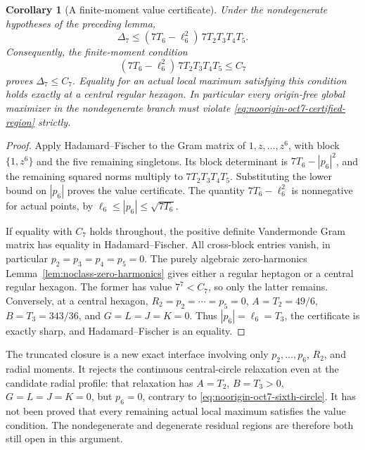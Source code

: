\documentclass[11pt]{article}
\newtheorem{corollary}[theorem]{Corollary}
\theoremstyle{remark}
\numberwithin{equation}{section}
\begin{document}
\begin{corollary}[A finite-moment value certificate]
\label{cor:noorigin-oct7-value-certificate}
Under the nondegenerate hypotheses of the preceding lemma,
\begin{equation}\label{eq:noorigin-oct7-Fischer-sixth}
 \Delta_7\le
             (7T_6-\ell_6^2)\,7T_2T_3T_4T_5.
\end{equation}
Consequently, the finite-moment condition
\begin{equation}\label{eq:noorigin-oct7-certified-region}
     (7T_6-\ell_6^2)\,7T_2T_3T_4T_5\le C_7
\end{equation}
proves $\Delta_7\le C_7$. Equality for an actual local maximum
satisfying this condition holds exactly at a central regular hexagon.
In particular every origin-free global maximizer in the
nondegenerate branch must violate
\eqref{eq:noorigin-oct7-certified-region} strictly.
\end{corollary}
\begin{proof}
Apply Hadamard--Fischer to the Gram matrix of
$1,z,\ldots,z^6$, with block $\{1,z^6\}$ and the five remaining
singletons. Its block determinant is $7T_6-|p_6|^2$, and the
remaining squared norms multiply to $7T_2T_3T_4T_5$. Substituting
the lower bound on $|p_6|$ proves the value certificate.
The quantity $7T_6-\ell_6^2$ is nonnegative for actual points,
by $\ell_6\le|p_6|\le\sqrt{7T_6}$.

If equality with $C_7$ holds throughout, the positive definite
Vandermonde Gram matrix has equality in Hadamard--Fischer.
All cross-block entries vanish, in particular
$p_2=p_3=p_4=p_5=0$. The purely algebraic zero-harmonics
Lemma~\ref{lem:noclass-zero-harmonics} gives either a regular
heptagon or a central regular hexagon. The former has value
$7^7<C_7$, so only the latter remains. Conversely, at a central
hexagon, $R_2=p_2=\cdots=p_5=0$,
$A=T_2=49/6$, $B=T_3=343/36$, and $G=L=J=K=0$.
Thus $|p_6|=\ell_6=T_3$, the certificate is exactly sharp,
and Hadamard--Fischer is an equality.
\end{proof}

The truncated closure is a new exact interface involving
only $p_2,\ldots,p_6$, $R_2$, and radial moments. It rejects the
continuous central-circle relaxation even at the candidate radial
profile: that relaxation has $A=T_2$, $B=T_3>0$, $G=L=J=K=0$,
but $p_6=0$, contrary to \eqref{eq:noorigin-oct7-sixth-circle}.
It has not been proved that every remaining actual local maximum
satisfies the value condition. The nondegenerate and degenerate
residual regions are therefore both still open in this argument.
\end{document}
